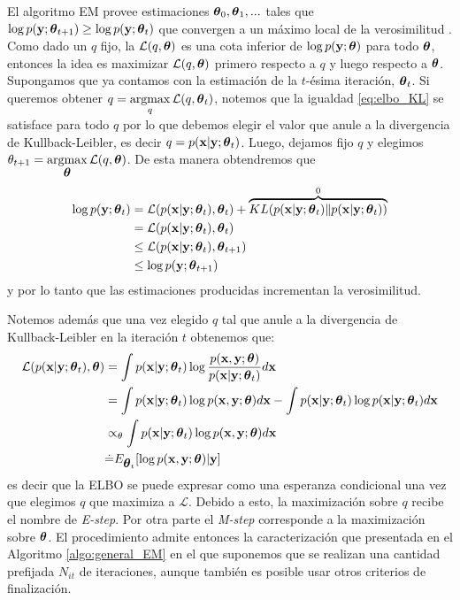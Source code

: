 El algoritmo EM provee estimaciones $\mbox{\boldmath$ \theta $}_0, \mbox{\boldmath$ \theta $}_1, ...$ tales que $\log p(\mathbf{y}; \mbox{\boldmath$ \theta $}_{t+1}) \geq \log p(\mathbf{y}; \mbox{\boldmath$ \theta $}_t)$ que convergen a un máximo local de la verosimilitud \citep{Wu1983}. Como dado un $q$ fijo, la $\mathcal{L}(q,\mbox{\boldmath$ \theta $})$ es una cota inferior de $\log p(\mathbf{y}; \mbox{\boldmath$ \theta $})$ para todo $\mbox{\boldmath$ \theta $}$, entonces la idea es maximizar $\mathcal{L}(q,\mbox{\boldmath$ \theta $})$ primero respecto a $q$ y luego respecto a $\mbox{\boldmath$ \theta $}$. Supongamos que ya contamos con la estimación de la $t$-ésima iteración, $\mbox{\boldmath$ \theta $}_t$. Si queremos obtener $q = \operatorname*{argmax}\limits_{q}\mathcal{L}(q,\mbox{\boldmath$ \theta $}_t)$, notemos que la igualdad \ref{eq:elbo_KL} se satisface para todo $q$ por lo que debemos elegir el valor que anule a la divergencia de Kullback-Leibler, es decir $q = p(\mathbf{x} | \mathbf{y}; \mbox{\boldmath$ \theta $}_t)$. Luego, dejamos fijo $q$ y elegimos $\theta_{t+1} = \operatorname*{argmax}\limits_{\mbox{\boldmath$ \theta $}} \mathcal{L}(q,\mbox{\boldmath$ \theta $})$. De esta manera obtendremos que 
\begin{align*}
    \log p(\mathbf{y}; \mbox{\boldmath$ \theta $}_t) &= \mathcal{L}(p(\mathbf{x} | \mathbf{y}; \mbox{\boldmath$ \theta $}_t), \mbox{\boldmath$ \theta $}_t) + \overbrace{KL(p(\mathbf{x} | \mathbf{y}; \mbox{\boldmath$ \theta $}_t) \rVert p(\mathbf{x} | \mathbf{y}; \mbox{\boldmath$ \theta $}_t))}^{0} \\
    &= \mathcal{L}(p(\mathbf{x} | \mathbf{y}; \mbox{\boldmath$ \theta $}_t), \mbox{\boldmath$ \theta $}_t) \\
    &\leq \mathcal{L}(p(\mathbf{x} | \mathbf{y}; \mbox{\boldmath$ \theta $}_t), \mbox{\boldmath$ \theta $}_{t+1}) \\
    &\leq \log p(\mathbf{y}; \mbox{\boldmath$ \theta $}_{t+1})
\end{align*}
y por lo tanto que las estimaciones producidas incrementan la verosimilitud.

Notemos además que una vez elegido $q$ tal que anule a la divergencia de Kullback-Leibler en la iteración $t$ obtenemos que:
\begin{align*}
    \mathcal{L}(p(\mathbf{x} | \mathbf{y}; \mbox{\boldmath$ \theta $}_t), \mbox{\boldmath$ \theta $}) &= \int p(\mathbf{x} | \mathbf{y}; \mbox{\boldmath$ \theta $}_t) \log \frac{p(\mathbf{x}, \mathbf{y}; \mbox{\boldmath$ \theta $})}{p(\mathbf{x} | \mathbf{y}; \mbox{\boldmath$ \theta $}_t)} d\mathbf{x} \\
    &= \int p(\mathbf{x} | \mathbf{y}; \mbox{\boldmath$ \theta $}_t) \log p(\mathbf{x}, \mathbf{y}; \mbox{\boldmath$ \theta $}) d\mathbf{x} - \int p(\mathbf{x} | \mathbf{y}; \mbox{\boldmath$ \theta $}_t) \log p(\mathbf{x} | \mathbf{y}; \mbox{\boldmath$ \theta $}_t) d\mathbf{x} \\
    &\propto_{\theta} \int p(\mathbf{x} | \mathbf{y}; \mbox{\boldmath$ \theta $}_t) \log p(\mathbf{x}, \mathbf{y}; \mbox{\boldmath$ \theta $}) d\mathbf{x} \\
    &\dot{=} E_{\mbox{\boldmath$ \theta $}_t}[\log p(\mathbf{x}, \mathbf{y}; \mbox{\boldmath$ \theta $})| \mathbf{y}]
\end{align*}
es decir que la ELBO se puede expresar como una esperanza condicional una vez que elegimos $q$ que maximiza a $\mathcal{L}$. Debido a esto, la maximización sobre $q$ recibe el nombre de \textit{E-step}. Por otra parte el \textit{M-step} corresponde a la maximización sobre $\mbox{\boldmath$ \theta $}$. El procedimiento admite entonces la caracterización que presentada en el Algoritmo \ref{algo:general_EM} en el que suponemos que se realizan una cantidad prefijada $N_{it}$ de iteraciones, aunque también es posible usar otros criterios de finalización.

